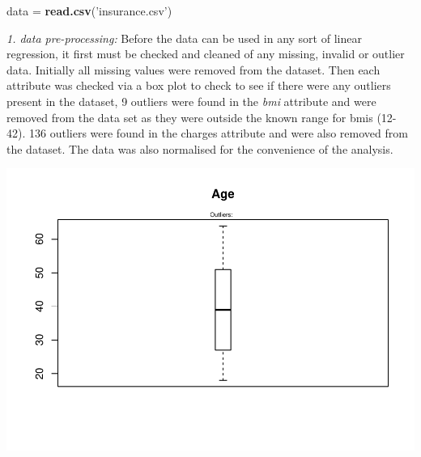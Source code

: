 \documentclass[
]{article}
\newenvironment{Shaded}{\begin{snugshade}}{\end{snugshade}}
\newcommand{\CommentTok}[1]{\textcolor[rgb]{0.56,0.35,0.01}{\textit{#1}}}
\newcommand{\DataTypeTok}[1]{\textcolor[rgb]{0.13,0.29,0.53}{#1}}
\newcommand{\FloatTok}[1]{\textcolor[rgb]{0.00,0.00,0.81}{#1}}
\newcommand{\KeywordTok}[1]{\textcolor[rgb]{0.13,0.29,0.53}{\textbf{#1}}}
\newcommand{\NormalTok}[1]{#1}
\newcommand{\OperatorTok}[1]{\textcolor[rgb]{0.81,0.36,0.00}{\textbf{#1}}}
\newcommand{\StringTok}[1]{\textcolor[rgb]{0.31,0.60,0.02}{#1}}
\begin{document}
\begin{Shaded}
\begin{Highlighting}[]
\NormalTok{data =}\StringTok{ }\KeywordTok{read.csv}\NormalTok{(}\StringTok{'insurance.csv'}\NormalTok{)}
\end{Highlighting}
\end{Shaded}

\emph{1. data pre-processing:} Before the data can be used in any sort
of linear regression, it first must be checked and cleaned of any
missing, invalid or outlier data. Initially all missing values were
removed from the dataset. Then each attribute was checked via a box plot
to check to see if there were any outliers present in the dataset, 9
outliers were found in the \emph{bmi} attribute and were removed from
the data set as they were outside the known range for bmis (12-42). 136
outliers were found in the charges attribute and were also removed from
the dataset. The data was also normalised for the convenience of the
analysis.

\begin{Shaded}
\end{Shaded}

\includegraphics{assessment-1_files/figure-latex/unnamed-chunk-10-1.pdf}
\end{document}
